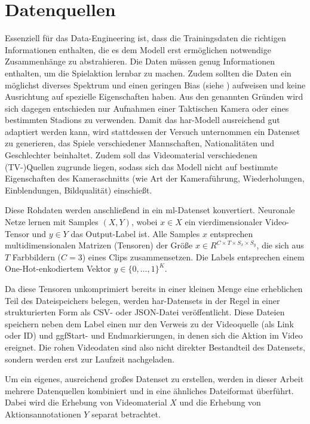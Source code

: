 \section{Datenquellen}
\label{sec:datenquellen}

Essenziell für das Data-Engineering ist, dass die Trainingsdaten die richtigen Informationen enthalten, die es dem Modell erst ermöglichen notwendige Zusammenhänge zu abstrahieren.
Die Daten müssen genug Informationen enthalten, um die Spielaktion lernbar zu machen.
Zudem sollten die Daten ein möglichst diverses Spektrum und einen geringen Bias (siehe \cite{Gugger20}) aufweisen und keine Ausrichtung auf spezielle Eigenschaften haben.
Aus den genannten Gründen wird sich dagegen entschieden nur Aufnahmen einer Taktischen Kamera oder eines bestimmten Stadions zu verwenden.
Damit das \gls{har}-Modell ausreichend gut adaptiert werden kann, wird stattdessen der Versuch unternommen ein Datenset zu generieren, das Spiele verschiedener Mannschaften, Nationalitäten und Geschlechter beinhaltet.
Zudem soll das Videomaterial verschiedenen (TV-)Quellen zugrunde liegen, sodass sich das Modell nicht auf bestimmte Eigenschaften des Kameraschnitts (wie Art der Kameraführung, Wiederholungen, Einblendungen, Bildqualität) einschießt.

Diese Rohdaten werden anschließend in ein \gls{ml}-Datenset konvertiert.
Neuronale Netze lernen mit Samples $(X, Y)$, wobei $x \in X$ ein vierdimensionaler Video-Tensor und $y \in Y$ das Output-Label ist.
Alle Samples $x$ entsprechen multidimensionalen Matrizen (Tensoren) der Größe $x \in R^{C \times T \times S_x \times S_y}$, die sich aus $T$ Farbbildern ($C=3$) eines Clips zusammensetzen.
Die Labels entsprechen einem One-Hot-enkodiertem Vektor $y \in \{0, \dots, 1\}^K$.

Da diese Tensoren unkomprimiert bereits in einer kleinen Menge eine erheblichen Teil des Dateispeichers belegen, werden \gls{har}-Datensets in der Regel in einer strukturierten Form als CSV- oder JSON-Datei veröffentlicht.
Diese Dateien speichern neben dem Label einen nur den Verweis zu der Videoquelle (als Link oder ID) und ggf\. Start- und Endmarkierungen, in denen sich die Aktion im Video ereignet.
Die rohen Videodaten sind also nicht direkter Bestandteil des Datensets, sondern werden erst zur Laufzeit nachgeladen.

Um ein eigenes, ausreichend großes Datenset zu erstellen, werden in dieser Arbeit mehrere Datenquellen kombiniert und in eine ähnliches Dateiformat überführt.
Dabei wird die Erhebung von Videomaterial $X$ und die Erhebung von Aktionsannotationen $Y$ separat betrachtet.

